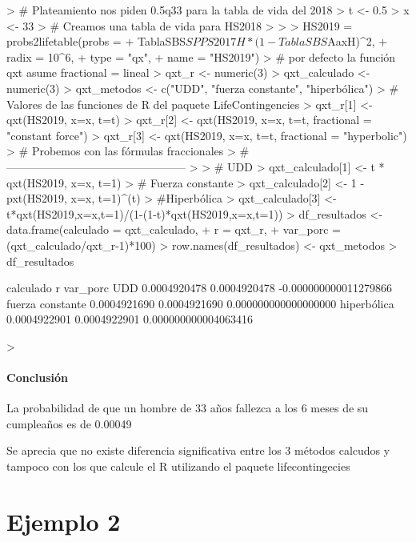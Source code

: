 \documentclass[12pt]{report}
\begin{document}
\begin{Schunk}
\begin{Sinput}
> # Plateamiento nos piden 0.5q33 para la tabla de vida del 2018
> t <- 0.5
> x <- 33
> # Creamos una tabla de vida para HS2018
> 
> 
> HS2019  = probs2lifetable(probs = 
+                             TablaSBS$SPPS2017H*(1-TablaSBS$AaxH)^2, 
+                           radix = 10^6,   
+                           type = "qx",  
+                           name = "HS2019")
> # por defecto la función qxt asume fractional = lineal
> qxt_r <- numeric(3)
> qxt_calculado <- numeric(3)
> qxt_metodos <- c("UDD", "fuerza constante", "hiperbólica")
> # Valores de las funciones de R del paquete LifeContingencies
> qxt_r[1] <- qxt(HS2019, x=x, t=t)
> qxt_r[2] <- qxt(HS2019, x=x, t=t, fractional = "constant force")
> qxt_r[3] <- qxt(HS2019, x=x, t=t, fractional = "hyperbolic")
> # Probemos con las fórmulas fraccionales
> #------------------------------------------------
> 
> # UDD
> qxt_calculado[1] <- t * qxt(HS2019, x=x, t=1) 
> # Fuerza constante
> qxt_calculado[2] <- 1 - pxt(HS2019, x=x, t=1)^(t) 
> #Hiperbólica
> qxt_calculado[3] <- t*qxt(HS2019,x=x,t=1)/(1-(1-t)*qxt(HS2019,x=x,t=1)) 
> df_resultados <- data.frame(calculado = qxt_calculado,
+                             r = qxt_r,
+                             var_porc = (qxt_calculado/qxt_r-1)*100)
> row.names(df_resultados) <- qxt_metodos
> df_resultados
\end{Sinput}
\begin{Soutput}
                    calculado            r              var_porc
UDD              0.0004920478 0.0004920478 -0.000000000011279866
fuerza constante 0.0004921690 0.0004921690  0.000000000000000000
hiperbólica      0.0004922901 0.0004922901  0.000000000004063416
\end{Soutput}
\begin{Sinput}
> 
\end{Sinput}
\end{Schunk}

\paragraph{Conclusi\'on}
La probabilidad de que un hombre de 33 años fallezca a los 6 meses de su cumpleaños es de 0.00049

Se aprecia que no existe diferencia significativa entre los 3 métodos calcudos y tampoco con los que calcule el R utilizando el paquete lifecontingecies

\section{Ejemplo 2}
\end{document}
